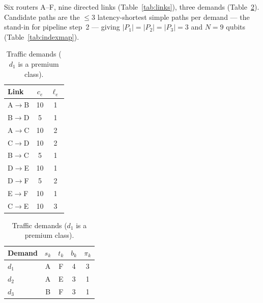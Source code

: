 \documentclass[11pt]{article}
\begin{document}
Six routers \textsf{A}--\textsf{F}, nine directed links
(Table~\ref{tab:links}), three demands (Table~\ref{tab:demands}). Candidate
paths are the $\le 3$ latency-shortest simple paths per demand --- the
stand-in for pipeline step~2 --- giving $|P_1| = |P_2| = |P_3| = 3$ and
$N = 9$ qubits (Table~\ref{tab:indexmap}).

\begin{table}[ht]
\centering
\begin{minipage}[t]{0.48\textwidth}
\centering
\begin{tabular}{lcc}
\toprule
Link & $c_e$ & $\ell_e$ \\
\midrule
A$\to$B & 10 & 1 \\
B$\to$D & 5  & 1 \\
A$\to$C & 10 & 2 \\
C$\to$D & 10 & 2 \\
B$\to$C & 5  & 1 \\
D$\to$E & 10 & 1 \\
D$\to$F & 5  & 2 \\
E$\to$F & 10 & 1 \\
C$\to$E & 10 & 3 \\
\bottomrule
\end{tabular}
\caption{Links (capacity, latency).}
\label{tab:links}
\end{minipage}\hfill
\begin{minipage}[t]{0.48\textwidth}
\centering
\begin{tabular}{lcccc}
\toprule
Demand & $s_k$ & $t_k$ & $b_k$ & $\pi_k$ \\
\midrule
$d_1$ & A & F & 4 & 3 \\
$d_2$ & A & E & 3 & 1 \\
$d_3$ & B & F & 3 & 1 \\
\bottomrule
\end{tabular}
\caption{Traffic demands ($d_1$ is a premium class).}
\label{tab:demands}
\end{minipage}
\end{table}
\end{document}
